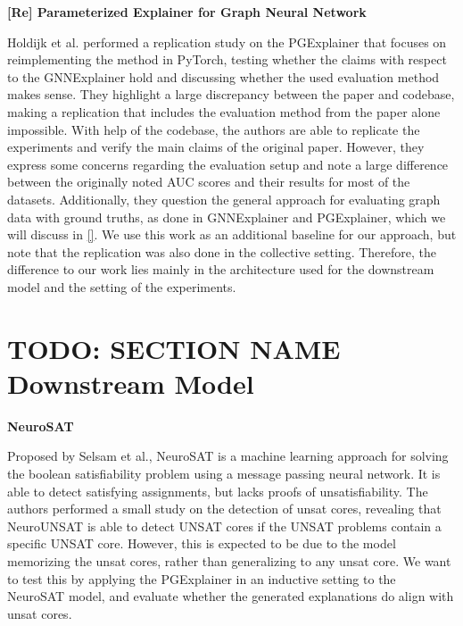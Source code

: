 \textbf{[Re] Parameterized Explainer for Graph Neural Network} \par
Holdijk et al. \cite{holdijk2021re} performed a replication study on the PGExplainer that focuses on reimplementing the method in PyTorch, testing whether the claims with respect to the GNNExplainer hold and discussing whether the used evaluation method makes sense. They highlight a large discrepancy between the paper and codebase, making a replication that includes the evaluation method from the paper alone impossible. With help of the codebase, the authors are able to replicate the experiments and verify the main claims of the original paper. However, they express some concerns regarding the evaluation setup and note a large difference between the originally noted AUC scores and their results for most of the datasets. Additionally, they question the general approach for evaluating graph data with ground truths, as done in GNNExplainer and PGExplainer, which we will discuss in \ref{}. We use this work as an additional baseline for our approach, but note that the replication was also done in the collective setting. Therefore, the difference to our work lies mainly in the architecture used for the downstream model and the setting of the experiments.


\section{TODO: SECTION NAME Downstream Model}
\label{sec:Downstream_Models}

\textbf{NeuroSAT}\par
Proposed by Selsam et al., NeuroSAT \cite{selsam2018learning} is a machine learning approach for solving the boolean satisfiability problem using a message passing neural network. It is able to detect satisfying assignments, but lacks proofs of unsatisfiability. The authors performed a small study on the detection of unsat cores, revealing that NeuroUNSAT is able to detect UNSAT cores if the UNSAT problems contain a specific UNSAT core. However, this is expected to be due to the model memorizing the unsat cores, rather than generalizing to any unsat core. We want to test this by applying the PGExplainer in an inductive setting to the NeuroSAT model, and evaluate whether the generated explanations do align with unsat cores.